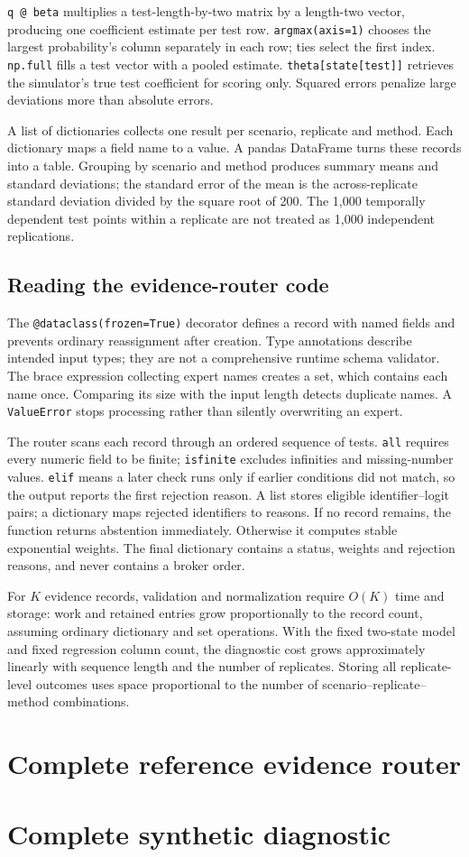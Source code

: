 \texttt{q @ beta} multiplies a test-length-by-two matrix by a length-two vector, producing one coefficient estimate per test row. \texttt{argmax(axis=1)} chooses the largest probability's column separately in each row; ties select the first index. \texttt{np.full} fills a test vector with a pooled estimate. \texttt{theta[state[test]]} retrieves the simulator's true test coefficient for scoring only. Squared errors penalize large deviations more than absolute errors.

A list of dictionaries collects one result per scenario, replicate and method. Each dictionary maps a field name to a value. A pandas DataFrame turns these records into a table. Grouping by scenario and method produces summary means and standard deviations; the standard error of the mean is the across-replicate standard deviation divided by the square root of 200. The 1,000 temporally dependent test points within a replicate are not treated as 1,000 independent replications.

\subsection{Reading the evidence-router code}
The \texttt{@dataclass(frozen=True)} decorator defines a record with named fields and prevents ordinary reassignment after creation. Type annotations describe intended input types; they are not a comprehensive runtime schema validator. The brace expression collecting expert names creates a set, which contains each name once. Comparing its size with the input length detects duplicate names. A \texttt{ValueError} stops processing rather than silently overwriting an expert.

The router scans each record through an ordered sequence of tests. \texttt{all} requires every numeric field to be finite; \texttt{isfinite} excludes infinities and missing-number values. \texttt{elif} means a later check runs only if earlier conditions did not match, so the output reports the first rejection reason. A list stores eligible identifier--logit pairs; a dictionary maps rejected identifiers to reasons. If no record remains, the function returns abstention immediately. Otherwise it computes stable exponential weights. The final dictionary contains a status, weights and rejection reasons, and never contains a broker order.

For $K$ evidence records, validation and normalization require $O(K)$ time and storage: work and retained entries grow proportionally to the record count, assuming ordinary dictionary and set operations. With the fixed two-state model and fixed regression column count, the diagnostic cost grows approximately linearly with sequence length and the number of replicates. Storing all replicate-level outcomes uses space proportional to the number of scenario--replicate--method combinations.

\section{Complete reference evidence router}

\section{Complete synthetic diagnostic}

